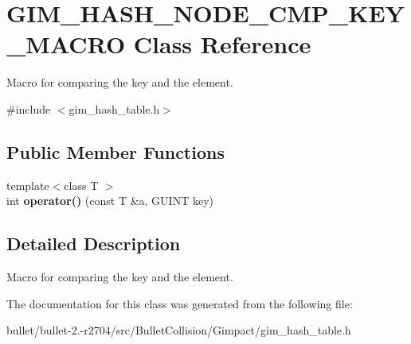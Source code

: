 \hypertarget{class_g_i_m___h_a_s_h___n_o_d_e___c_m_p___k_e_y___m_a_c_r_o}{\section{G\+I\+M\+\_\+\+H\+A\+S\+H\+\_\+\+N\+O\+D\+E\+\_\+\+C\+M\+P\+\_\+\+K\+E\+Y\+\_\+\+M\+A\+C\+R\+O Class Reference}
\label{class_g_i_m___h_a_s_h___n_o_d_e___c_m_p___k_e_y___m_a_c_r_o}
}


Macro for comparing the key and the element.  




{\ttfamily \#include $<$gim\+\_\+hash\+\_\+table.\+h$>$}

\subsection*{Public Member Functions}
\begin{DoxyCompactItemize}
\item 
\hypertarget{class_g_i_m___h_a_s_h___n_o_d_e___c_m_p___k_e_y___m_a_c_r_o_a1618a6e0c61c206522b4ed84b39be8e2}{{\footnotesize template$<$class T $>$ }\\int {\bfseries operator()} (const T \&a, G\+U\+I\+N\+T key)}\label{class_g_i_m___h_a_s_h___n_o_d_e___c_m_p___k_e_y___m_a_c_r_o_a1618a6e0c61c206522b4ed84b39be8e2}

\end{DoxyCompactItemize}


\subsection{Detailed Description}
Macro for comparing the key and the element. 

The documentation for this class was generated from the following file\+:\begin{DoxyCompactItemize}
\item 
bullet/bullet-\/2.-\/r2704/src/\+Bullet\+Collision/\+Gimpact/gim\+\_\+hash\+\_\+table.\+h\end{DoxyCompactItemize}
